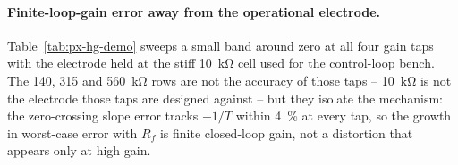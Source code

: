 %

\paragraph{Finite-loop-gain error away from the operational electrode.}
Table~\ref{tab:px-hg-demo} sweeps a small band around zero at all four gain
taps with the electrode held at the stiff \SI{10}{\kilo\ohm} cell used for the
control-loop bench. The 140, 315 and \SI{560}{\kilo\ohm} rows are not the
accuracy of those taps -- \SI{10}{\kilo\ohm} is not the electrode those taps
are designed against -- but they isolate the mechanism: the zero-crossing
slope error tracks $-1/T$ within \SI{4}{\percent} at every tap, so the growth
in worst-case error with $R_f$ is finite closed-loop gain, not a distortion
that appears only at high gain.
